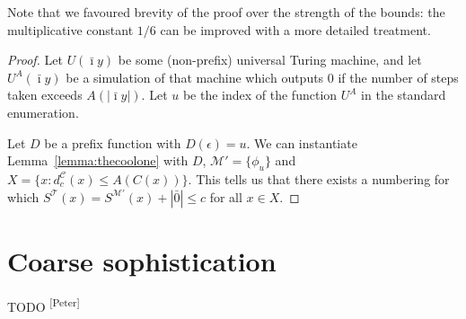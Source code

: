 \documentclass{style/llncs}
\newcommand{\M}{\mathscr M}
\newcommand{\C}{\mathscr C}
\newcommand{\T}{\mathscr T}
\newcommand{\s}{S}
\newcommand{\pb}[1]{\textcolor{OliveGreen}{\small #1 \textsuperscript{[Peter]} }}
\begin{document}
Note that we favoured brevity of the proof over the strength of the bounds: the multiplicative constant $1/6$ can be improved with a more detailed treatment.

\depth*
\begin{proof}
Let $U(\bar\imath y)$ be some (non-prefix) universal Turing machine, and let $U^A(\bar\imath y)$ be a simulation of that machine which outputs $0$ if the number of steps taken exceeds $A(|\bar\imath y|)$. Let $u$ be the index of the function $U^A$ in the standard enumeration.

Let $D$ be a prefix function with $D(\epsilon) = u$. We can instantiate Lemma~\ref{lemma:thecoolone} with $D$, $\M' = \{\phi_u\}$ and $X = \{x : d^\C_c(x) \leq A(C(x))\}$. This tells us that there exists a numbering for which $\s^\T(x) = \s^{\M'}(x) + |\bar0| \leq c$ for all $x \in X$.
\end{proof}

\section{Coarse sophistication}

\pb{TODO}
\end{document}
